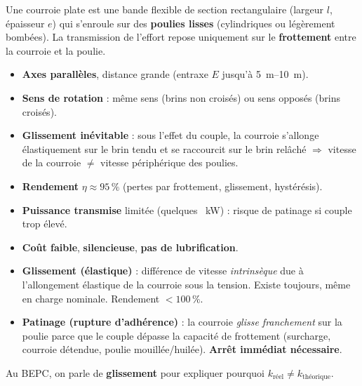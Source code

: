 \documentclass[11pt]{article}
\newcommand{\cle}[1]{{\popxbold\color{popdark}#1}}
\begin{document}
\begin{definition}
Une \cle{courroie plate} est une bande flexible de section rectangulaire (largeur $l$, épaisseur $e$) qui s'enroule sur des \textbf{poulies lisses} (cylindriques ou légèrement bombées). La transmission de l'effort repose uniquement sur le \textbf{frottement} entre la courroie et la poulie.
\end{definition}

\begin{propriete}
\begin{itemize}
    \item \textbf{Axes parallèles}, distance grande (entraxe $E$ jusqu'à \SIrange{5}{10}{\meter}).
    \item \textbf{Sens de rotation} : même sens (brins non croisés) ou sens opposés (brins croisés).
    \item \textbf{Glissement inévitable} : sous l'effet du couple, la courroie s'allonge élastiquement sur le brin tendu et se raccourcit sur le brin relâché $\Rightarrow$ vitesse de la courroie $\neq$ vitesse périphérique des poulies.
    \item \textbf{Rendement} $\eta \approx 95\,\%$ (pertes par frottement, glissement, hystérésis).
    \item \textbf{Puissance transmise} limitée (quelques \SI{}{\kilo\watt}) : risque de patinage si couple trop élevé.
    \item \textbf{Coût faible}, \textbf{silencieuse}, \textbf{pas de lubrification}.
\end{itemize}
\end{propriete}

\begin{attention}
\begin{itemize}
    \item \textbf{Glissement (élastique)} : différence de vitesse \emph{intrinsèque} due à l'allongement élastique de la courroie sous la tension. Existe toujours, même en charge nominale. Rendement $< 100\,\%$.
    \item \textbf{Patinage (rupture d'adhérence)} : la courroie \emph{glisse franchement} sur la poulie parce que le couple dépasse la capacité de frottement (surcharge, courroie détendue, poulie mouillée/huilée). \textbf{Arrêt immédiat nécessaire}.
\end{itemize}
Au BEPC, on parle de \textbf{glissement} pour expliquer pourquoi $k_{\text{réel}} \neq k_{\text{théorique}}$.
\end{attention}
\end{document}
